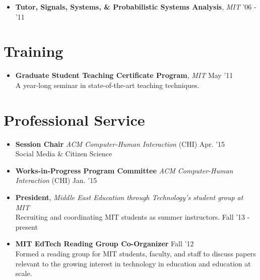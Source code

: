 \documentclass[margin]{res}
\begin{document}
\begin{resume}
\begin{itemize}[leftmargin=*]
\item {\bf Tutor, Signals, Systems, \& Probabilistic Systems Analysis}, {\it MIT} \hfill '06 - '11 %
\end{itemize}



\section{Training}
\begin{itemize}[leftmargin=*]
\item {\bf Graduate Student Teaching Certificate Program}, {\it MIT} \hfill May '11 \\ A year-long seminar in state-of-the-art teaching techniques.
\end{itemize}

\section{Professional Service}

                \begin{itemize}[leftmargin=*] %
\item {\bf Session Chair} {\it ACM Computer-Human Interaction} (CHI) \hfill Apr. '15 \\
Social Media \& Citizen Science
\item {\bf Works-in-Progress Program Committee} {\it ACM Computer-Human Interaction} (CHI)  \hfill Jan. '15 


\item {\bf President}, {\it Middle East Education through Technology's student group at MIT} \\ Recruiting and coordinating MIT students as summer instructors. \hfill Fall '13 - present %

		\item {\bf MIT EdTech Reading Group Co-Organizer} \hfill Fall '12 \\ Formed a reading group for MIT students, faculty, and staff to discuss papers relevant to the growing interest in technology in education and education at scale.


\end{itemize}
\end{resume}
\end{document}
